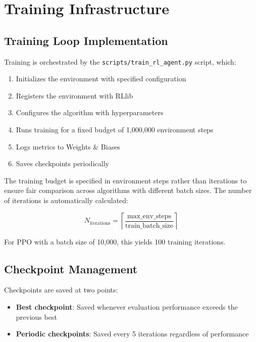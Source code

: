 \documentclass[english,bachelor]{hsluthesis}
\begin{document}
\section{Training Infrastructure}

\subsection{Training Loop Implementation}

Training is orchestrated by the \texttt{scripts/train\_rl\_agent.py} script, which:

\begin{enumerate}
    \item Initializes the environment with specified configuration
    \item Registers the environment with RLlib
    \item Configures the algorithm with hyperparameters
    \item Runs training for a fixed budget of 1,000,000 environment steps
    \item Logs metrics to Weights \& Biases
    \item Saves checkpoints periodically
\end{enumerate}

The training budget is specified in environment steps rather than iterations to ensure fair comparison across algorithms with different batch sizes. The number of iterations is automatically calculated:

\begin{equation}
N_{\text{iterations}} = \left\lceil \frac{\text{max\_env\_steps}}{\text{train\_batch\_size}} \right\rceil
\end{equation}

For PPO with a batch size of 10,000, this yields 100 training iterations.

\subsection{Checkpoint Management}

Checkpoints are saved at two points:

\begin{itemize}
    \item \textbf{Best checkpoint}: Saved whenever evaluation performance exceeds the previous best
    \item \textbf{Periodic checkpoints}: Saved every 5 iterations regardless of performance
\end{itemize}
\end{document}
